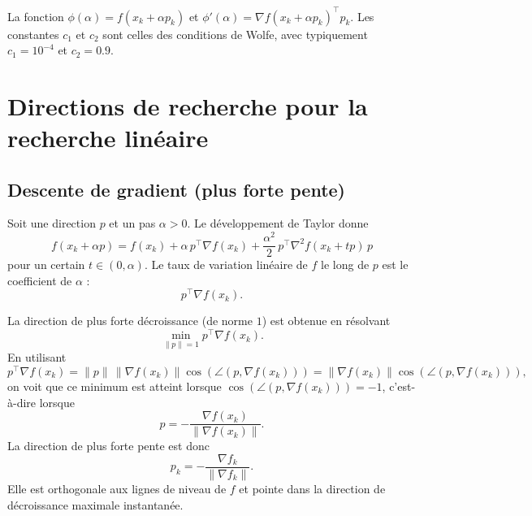 \begin{remarque}
La fonction $\phi(\alpha) = f(x_k + \alpha p_k)$ et $\phi'(\alpha) = \nabla f(x_k + \alpha p_k)^\top p_k$.
Les constantes $c_1$ et $c_2$ sont celles des conditions de Wolfe, avec typiquement $c_1 = 10^{-4}$ et $c_2 = 0.9$.
\end{remarque}

\section{Directions de recherche pour la recherche linéaire}
\label{sec:2.4}

\subsection{Descente de gradient (plus forte pente)}
\label{subsec:2.4.1}

Soit une direction $p$ et un pas $\alpha>0$. Le développement de Taylor donne
\[
    f(x_k + \alpha p)
    = f(x_k) + \alpha\,p^\top \nabla f(x_k)
      + \frac{\alpha^2}{2}\,p^\top \nabla^2 f(x_k + t p)\,p
\]
pour un certain $t \in (0,\alpha)$. Le taux de variation linéaire de $f$ le long
de $p$ est le coefficient de $\alpha$ :
\[
    p^\top \nabla f(x_k).
\]

La direction de plus forte décroissance (de norme $1$) est obtenue en résolvant
\[
    \min_{\|p\|=1} p^\top \nabla f(x_k).
\]
En utilisant
\[
    p^\top \nabla f(x_k)
    = \|p\|\,\|\nabla f(x_k)\|
      \cos(\angle(p,\nabla f(x_k)))
    = \|\nabla f(x_k)\|
      \cos(\angle(p,\nabla f(x_k))),
\]
on voit que ce minimum est atteint lorsque
$\cos(\angle(p,\nabla f(x_k))) = -1$, c’est-à-dire lorsque
\[
    p = -\frac{\nabla f(x_k)}{\|\nabla f(x_k)\|}.
\]
La direction de plus forte pente est donc
\begin{equation}
    p_k = -\frac{\nabla f_k}{\|\nabla f_k\|}.
\end{equation}
Elle est orthogonale aux lignes de niveau de $f$ et pointe dans la direction de
décroissance maximale instantanée.

